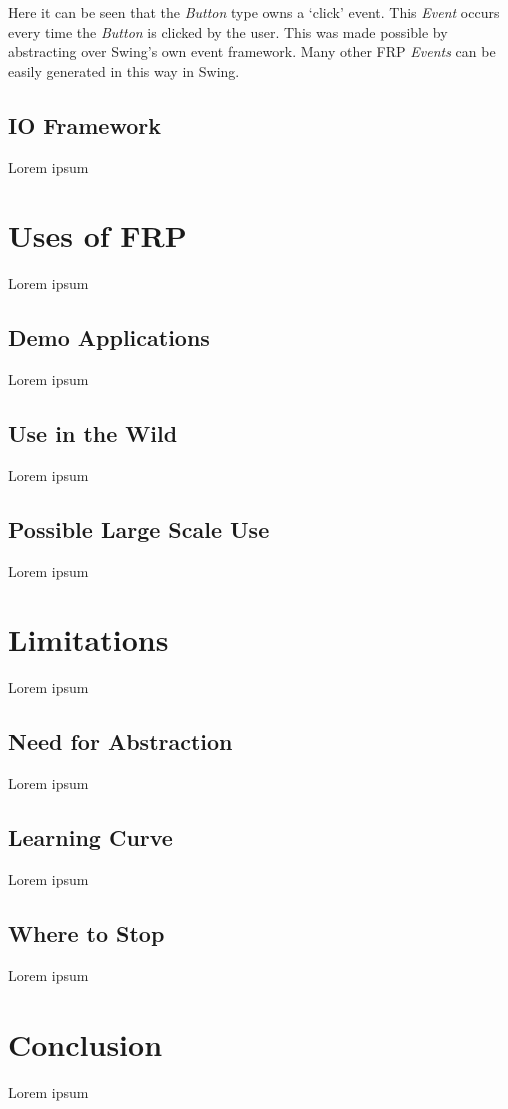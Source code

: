 \documentclass[12pt]{article}
\begin{document}
      Here it can be seen that the \emph{Button} type owns a `click' event. This \emph{Event} occurs every time the 
      \emph{Button} is clicked by the user. This was made possible by abstracting over Swing's own event framework. Many other 
      FRP \emph{Events} can be easily generated in this way in Swing.
    
    \subsection{IO Framework}
    Lorem ipsum
    
  \section{Uses of FRP}
  Lorem ipsum
  
    \subsection{Demo Applications}
    Lorem ipsum
    
    \subsection{Use in the Wild}
    Lorem ipsum
    
    \subsection{Possible Large Scale Use}
    Lorem ipsum
    
  \section{Limitations}
    Lorem ipsum
    
    \subsection{Need for Abstraction}
    Lorem ipsum
    
    \subsection{Learning Curve}
    Lorem ipsum
    
    \subsection{Where to Stop}
    Lorem ipsum
    
  \section{Conclusion}
  Lorem ipsum
  
\end{document}

